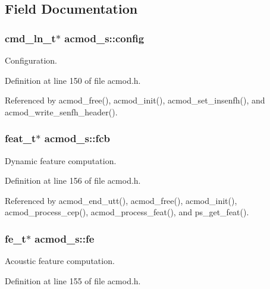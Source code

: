 \subsection{Field Documentation}
\subsubsection[{config}]{\setlength{\rightskip}{0pt plus 5cm}cmd\+\_\+ln\+\_\+t$\ast$ acmod\+\_\+s\+::config}\label{structacmod__s_a3563f4d0bdc48d3ee140b9e28806279d}


Configuration. 



Definition at line 150 of file acmod.\+h.



Referenced by acmod\+\_\+free(), acmod\+\_\+init(), acmod\+\_\+set\+\_\+insenfh(), and acmod\+\_\+write\+\_\+senfh\+\_\+header().

\subsubsection[{fcb}]{\setlength{\rightskip}{0pt plus 5cm}feat\+\_\+t$\ast$ acmod\+\_\+s\+::fcb}\label{structacmod__s_a37ec6c2b1f3ada764842e08481239b34}


Dynamic feature computation. 



Definition at line 156 of file acmod.\+h.



Referenced by acmod\+\_\+end\+\_\+utt(), acmod\+\_\+free(), acmod\+\_\+init(), acmod\+\_\+process\+\_\+cep(), acmod\+\_\+process\+\_\+feat(), and ps\+\_\+get\+\_\+feat().

\subsubsection[{fe}]{\setlength{\rightskip}{0pt plus 5cm}fe\+\_\+t$\ast$ acmod\+\_\+s\+::fe}\label{structacmod__s_a56eaceb9b6a1cbcccd09cf42cfa87231}


Acoustic feature computation. 



Definition at line 155 of file acmod.\+h.



